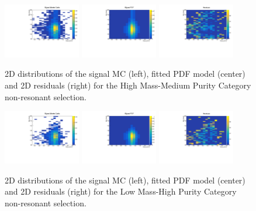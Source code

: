 \begin{figure}[h]
  \centering
\includegraphics[width=0.3\textwidth]{figures/sec-signals/SignalResiduals/h_mc_HM_cat1}\hfil
\includegraphics[width=0.3\textwidth]{figures/sec-signals/SignalResiduals/h_pd_HM_cat1}\hfil
\includegraphics[width=0.3\textwidth]{figures/sec-signals/SignalResiduals/h_re_HM_cat1}\hfil
  \caption{2D distributions of the signal MC (left), fitted PDF model (center) and 2D residuals (right) for the High Mass-Medium Purity Category non-resonant selection.}
  \label{fig:sig_resi_hm_mpc}
\end{figure}

\begin{figure}[h]
  \centering
\includegraphics[width=0.3\textwidth]{figures/sec-signals/SignalResiduals/h_mc_LM_cat0}\hfil
\includegraphics[width=0.3\textwidth]{figures/sec-signals/SignalResiduals/h_pd_LM_cat0}\hfil
\includegraphics[width=0.3\textwidth]{figures/sec-signals/SignalResiduals/h_re_LM_cat0}\hfil
  \caption{2D distributions of the signal MC (left), fitted PDF model (center) and 2D residuals (right) for the Low Mass-High Purity Category non-resonant selection.}
  \label{fig:sig_resi_lm_hpc}
\end{figure}


